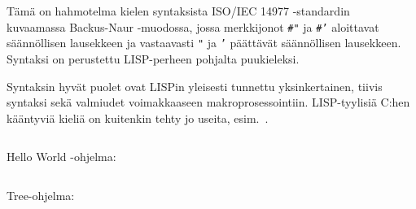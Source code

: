 
Tämä on hahmotelma kielen syntaksista ISO/IEC 14977
-standardin~\citep{iso14977} kuvaamassa Backus-Naur -muodossa, jossa
merkkijonot \texttt{\#"} ja \texttt{\#'} aloittavat säännöllisen lausekkeen ja
vastaavasti \texttt{"} ja \texttt{'} päättävät säännöllisen lausekkeen.
Syntaksi on perustettu LISP-perheen pohjalta puukieleksi.

Syntaksin hyvät puolet ovat LISPin yleisesti tunnettu yksinkertainen, tiivis
syntaksi sekä valmiudet voimakkaaseen makroprosessointiin. LISP-tyylisiä C:hen
kääntyviä kieliä on kuitenkin tehty jo useita, esim.~\citet{clisp3}.

\inputminted{\bnflexer}{lisp-base.bnf}

Hello World -ohjelma:

\inputminted{lisp}{hello.lisp}

\newpage

Tree-ohjelma:

\inputminted{lisp}{tree.lisp}

